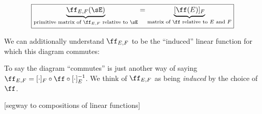 \begin{theorem}
    \begin{align*}
        \boxed
        {
            \underbrace{\ff_{E,F}(\sE)}_{\text{primitive matrix of $\ff_{E,F}$ relative to $\sE$}}
            =
            \underbrace{[\ff(E)]_F}_{\text{matrix of $\ff$ relative to $E$ and $F$}}
        }
    \end{align*}

    We can additionally understand $\ff_{E,F}$ to be the ``induced'' linear function for which this diagram commutes:
    
    \begin{center}
    \end{center}
        
    To say the diagram ``commutes'' is just another way of saying $\ff_{E,F} = [\cdot]_F \circ \ff \circ [\cdot]_E^{-1}$. We think of $\ff_{E,F}$ as being \textit{induced} by the choice of $\ff$.
    
        
\end{theorem}

[segway to compositions of linear functions]

